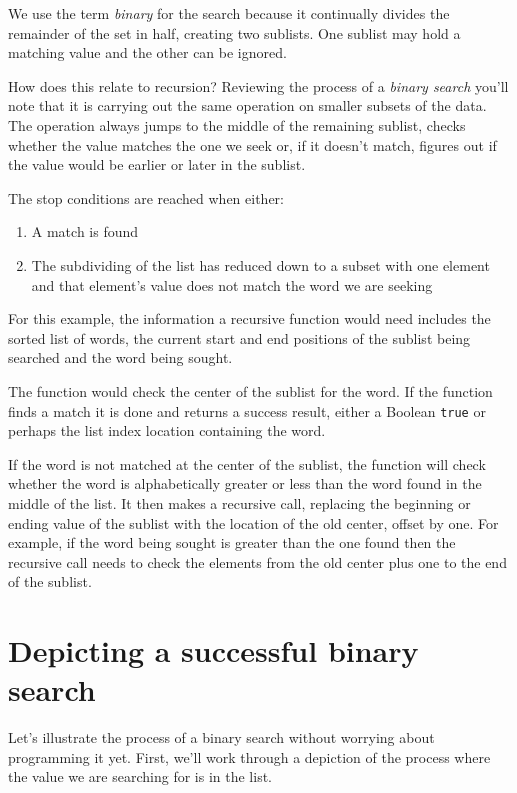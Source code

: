 
We use the term \textit{binary} for the search because it continually divides the remainder of the set in half, creating two sublists. One sublist may hold a matching value and the other can be ignored.

How does this relate to recursion? Reviewing the process of a \textit{binary search} you'll note that it is carrying out the same operation on smaller subsets of the data. The operation always jumps to the middle of the remaining sublist, checks whether the value matches the one we seek or, if it doesn't match, figures out if the value would be earlier or later in the sublist.

The stop conditions are reached when either:

\begin{enumerate}
	\item A match is found
	\item The subdividing of the list has reduced down to a subset with one element and that element's value does not match the word we are seeking
\end{enumerate}

For this example, the information a recursive function would need includes the sorted list of words, the current start and end positions of the sublist being searched and the word being sought.

The function would check the center of the sublist for the word. If the function finds a match it is done and returns a success result, either a Boolean \texttt{true} or perhaps the list index location containing the word. 

If the word is not matched at the center of the sublist, the function will check whether the word is alphabetically greater or less than the word found in the middle of the list. It then makes a recursive call, replacing the beginning or ending value of the sublist with the location of the old center, offset by one. For example, if the word being sought is greater than the one found then the recursive call needs to check the elements from the old center plus one to the end of the sublist.

\section{Depicting a successful binary search}

Let's illustrate the process of a binary search without worrying about programming it yet. First, we'll work through a depiction of the process where the value we are searching for is in the list. 

